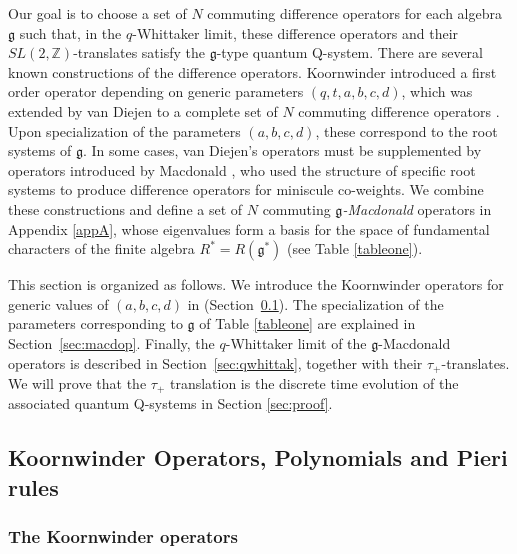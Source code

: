 \documentclass[12pt]{amsart}
\newcommand{\g}{{\mathfrak{g}}}
\newcommand{\Z}{{\mathbb Z}}
\numberwithin{equation}{section}
\begin{document}
Our goal is to choose a set of $N$ commuting difference operators for each  algebra $\g$ such that, in the $q$-Whittaker limit, these difference operators and their $SL(2,\Z)$-translates satisfy the $\g$-type quantum Q-system.
There are several known constructions of the difference operators. Koornwinder introduced a first order operator \cite{Koornwinder} depending on generic parameters $(q,t,a,b,c,d)$, which was extended by van Diejen to a complete set of $N$ commuting difference operators \cite{vandiej}. 
Upon specialization of the parameters $(a,b,c,d)$, these correspond to the root systems of $\g$. In some cases, van Diejen's operators must be supplemented by operators introduced by Macdonald \cite{macdoroot}, who used the structure of specific root systems to produce difference operators for miniscule co-weights.
We combine these constructions and define a set of $N$ commuting {\it $\g$-Macdonald} operators in Appendix \ref{appA}, whose eigenvalues form a basis for the space of fundamental characters of the finite algebra $R^*=R(\g^*)$ (see Table \ref{tableone}).

This section is organized as follows. We introduce the Koornwinder operators for generic values of $(a,b,c,d)$ in (Section~\ref{sec:macdopol}). The specialization of the parameters corresponding to $\g$ of Table \ref{tableone} are explained in Section~\ref{sec:macdop}.
Finally, the $q$-Whittaker limit of the $\g$-Macdonald operators is described in Section~\ref{sec:qwhittak}, together with their $\tau_+$-translates. We will prove that the $\tau_+$ translation is the discrete time evolution of the associated quantum Q-systems in Section \ref{sec:proof}.
%
%
%
%





\subsection{Koornwinder Operators, Polynomials and Pieri rules}
\label{sec:macdopol}




%
%
%
%
%


\subsubsection{The Koornwinder operators}
\label{kooropsec}
\end{document}
